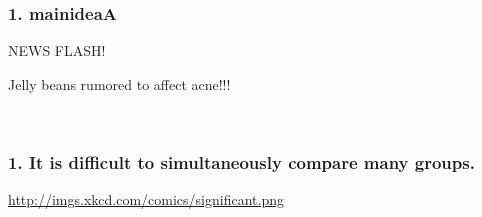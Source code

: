 \documentclass[11pt,containsverbatim,handout,xcolor=xelatex,dvipsnames,table]{beamer}
\newcommand{\soln}[1]{}
\newcommand{\mainideaA}{It is difficult to simultaneously compare many groups.}
\begin{document}
\begin{frame}
  \frametitle{1. mainideaA}

  \begin{center}
  {\Large NEWS FLASH!}

  \hspace{12pt}

  Jelly beans rumored to affect acne!!!
  \end{center}

  \pause


    \hfill \\

    \pause
   \soln{
     Use an independent samples t-test:
     \[
     H_0: \mu_{\textmd{jelly beans}} = \mu_{\textmd{placebo}}
     \]
     \[
     H_A: \mu_{\textmd{jelly beans}} \neq \mu_{\textmd{placebo}}
     \]
   }

\end{frame}


\begin{frame}
  \frametitle{1. \mainideaA}

  \vfill
  
  \begin{center}
  \url{http://imgs.xkcd.com/comics/significant.png}
  \end{center}

\end{frame}

\end{document}
